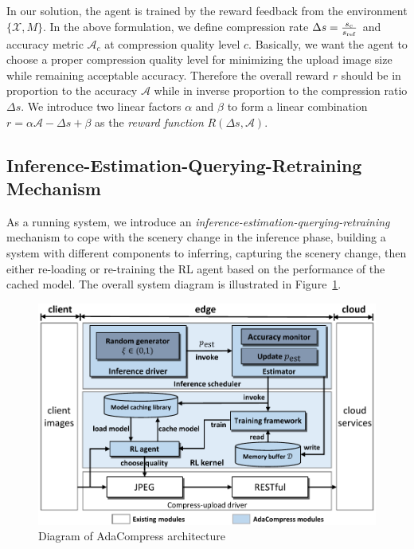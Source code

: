 In our solution, the agent is trained by the reward feedback from the environment $ \{\mathcal{X}, M\} $. In the above formulation, we define compression rate $ \Delta s = \frac{s_c}{s_{\rm ref}} $ and accuracy metric $ \mathcal{A}_c $ at compression quality level $ c $. Basically, we want the agent to choose a proper compression quality level for minimizing the upload image size while remaining acceptable accuracy. Therefore the overall reward $ r $ should be in proportion to the accuracy $ \mathcal{A} $ while in inverse proportion to the compression ratio $ \Delta s $. We introduce two linear factors $ \alpha $ and $ \beta $ to form a linear combination $ r = \alpha \mathcal{A} - \Delta s + \beta $ as the \emph{reward function} $ R(\Delta s, \mathcal{A}) $. %

\subsection{Inference-Estimation-Querying-Retraining Mechanism}

As a running system, we introduce an \emph{inference-estimation-querying-retraining} mechanism to cope with the scenery change in the inference phase, building a system with different components to inferring, capturing the scenery change, then either re-loading or re-training the RL agent based on the performance of the cached model. The overall system diagram is illustrated in Figure~\ref{fig: diagram}.


\begin{figure}[!t]
	\centerline{\includegraphics[width=0.8\linewidth]{figures/overall-diagram.pdf}}
	\caption{Diagram of AdaCompress architecture}
	\label{fig: diagram}
\end{figure}

